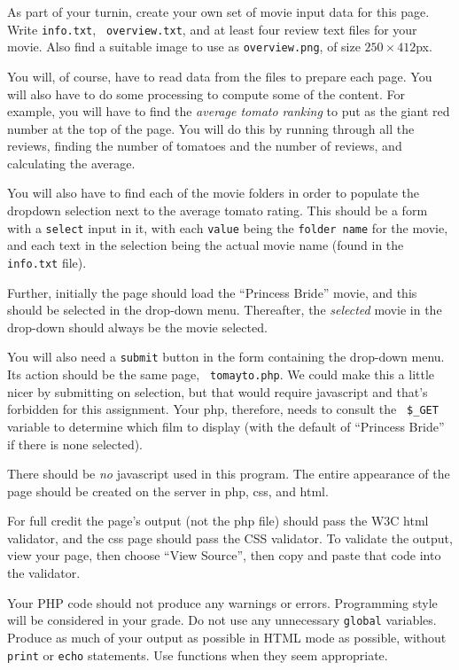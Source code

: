 \documentclass{article}
\newcommand{\myitem}[1]{\noindent\hspace{-.25in}{\bf #1}}
\begin{document}
\myitem{Your Own Movie:}  As part of your turnin, create your own set
of movie input data for this page.  Write {\tt info.txt}, {\tt
  overview.txt}, and at least four review text files for your movie.
Also find a suitable image to use as {\tt overview.png}, of size
$250\times412$px. 



\myitem{Server side computations:}   You will, of course, have to read
data from the files to prepare each page.  You will also have to do
some processing to compute some of the content.  For example, you will
have to find the {\em average tomato ranking} to put as the giant red
number at the top of the page.  You will do this by running through
all the reviews, finding the number of tomatoes and the number of
reviews, and calculating the average.

\myitem{Select movie dropdown:} You will also have to find each of the
movie folders in order to populate the dropdown selection next to the
average tomato rating.  This should be a form with a {\tt select}
input in it, with each {\tt value} being the {\tt folder name} for the
movie, and each text in the selection being the actual movie name
(found in the {\tt info.txt} file).

Further, initially the page should load the ``Princess Bride'' movie,
and this should be selected in the drop-down menu.  Thereafter, the
{\em selected} movie in the drop-down should always be the movie
selected.

You will also need a {\tt submit} button in the form containing the
drop-down menu.  Its action should be the same page, {\tt
  tomayto.php}.  We could make this a little nicer by submitting on
selection, but that would require javascript and that's forbidden for
this assignment.  Your php, therefore, needs to consult the {\tt
  \$\_GET} variable to determine which film to display (with the
default of ``Princess Bride'' if there is none selected).

  
\myitem{No javascript:} There should be {\em no} javascript used in
this program.  The entire appearance of the page should be created on
the server in php, css, and html.

\myitem{Validation:}  For full credit the page's output (not the php
file) should pass the W3C html validator, and the css page should pass
the CSS validator.  To validate the output, view your page, then
choose ``View Source'', then copy and paste that code into the
validator. 

\myitem{Style:} Your PHP code should not produce any warnings or
errors.  Programming style will be considered in your grade.  Do not
use any unnecessary {\tt global} variables.  Produce as much of your
output as possible in HTML mode as possible, without {\tt print} or
{\tt echo} statements.  Use functions when they seem appropriate.
\end{document}
